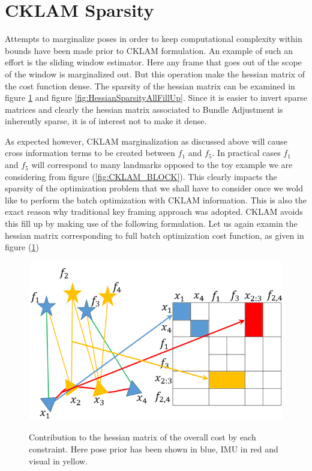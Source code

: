 \section{CKLAM Sparsity}
Attempts to marginalize poses in order to keep computational complexity within bounds have been made prior to CKLAM formulation. An example of such an effort is the sliding window estimator. Here any frame that goes out of the scope of the window is marginalized out. But this operation make the hessian matrix of the cost function dense. The sparsity of the hessian matrix can be examined in figure \ref{fig:HessianSparsity} and figure \ref{fig:HessianSparsityAllFillUp}. Since it is easier to invert sparse matrices and clearly the hessian matrix associated to Bundle Adjustment is inherently sparse, it is of interest not to make it dense.

As expected however, CKLAM marginalization as discussed above will cause cross information terms to be created between $f_1$ and $f_5$. In practical cases $f_1$ and $f_5$ will correspond to many landmarks opposed to the toy example we are considering from figure (\ref{fig:CKLAM_BLOCK}). This clearly impacts the sparsity of the optimization problem that we shall have to consider once we wold like to perform the batch optimization with CKLAM information. This is also the exact reason why traditional key framing approach was adopted. CKLAM avoids this fill up by making use of the following formulation. Let us again examin the hessian matrix corresponding to full batch optimization cost function, as given in figure (\ref{fig:HessianSparsity})

\begin{figure}[ht]
	\centering
		\includegraphics[width=1.00\textwidth]{images/HessianSparsity.png}
	\label{fig:HessianSparsity}
  \caption{Contribution to the hessian matrix of the overall cost by each constraint. Here pose prior has been shown in blue, IMU in red and visual in yellow.}
\end{figure}

